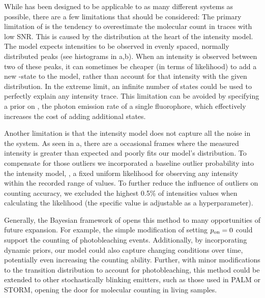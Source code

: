 While \ours has been designed to be applicable to as many different systems as
possible, there are a few limitations that should be considered:
  The primary limitation of \ours is the tendency to overestimate the molecular
  count in traces with low SNR.
  This is caused by the distribution at the heart of the intensity model. 
  The model expects intensities to be observed in evenly spaced, normally
  distributed peaks (see histograms in a,b).
  When an intensity is observed between two of these peaks, it can sometimes be
  cheaper (in terms of likelihood) to add a new \z{}-state to the model, rather
  than account for that intensity with the given distribution.
  In the extreme limit, an infinite number of states could be used to perfectly
  explain any intensity trace.
  This limitation can be avoided by specifying a prior on \re, the photon
  emission rate of a single fluorophore, which effectively increases the cost
  of adding additional states.

Another limitation is that the intensity model does not capture all the noise
in the system.
    As seen in a, there are a occasional
    frames where the measured intensity is greater than expected and poorly
    fits our model's distribution.
    To compensate for those outliers we incorporated a baseline outlier
    probability into the intensity model, \ie, a fixed uniform likelihood for
    observing any intensity within the recorded range of values.
    To further reduce the influence of outliers on counting accuracy, we
    excluded the highest 0.5\% of intensities values when calculating the
    likelihood (the specific value is adjustable as a hyperparameter).

Generally, the Bayesian framework of \ours opens this method to many
opportunities of future expansion.
    For example, the simple modification of setting $p_\text{on}=0$ could support the
    counting of photobleaching events.
    Additionally, by incorporating dynamic priors, our model could also capture
    changing conditions over time, potentially even increasing the counting
    ability.
    Further, with minor modifications to the transition distribution to account
    for photobleaching, this method could be extended to other stochastically
    blinking emitters, such as those used in PALM or STORM, opening the door
    for molecular counting in living samples.
